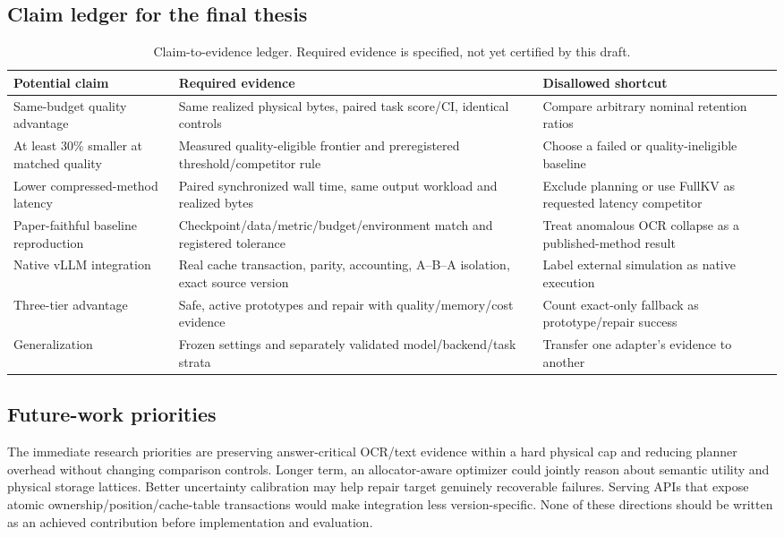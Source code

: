 \subsection{Claim ledger for the final thesis}
\begin{table}[t]
\caption{Claim-to-evidence ledger. Required evidence is specified, not yet
certified by this draft.}
\small\begin{tabularx}{\textwidth}{P{3.5cm}YY}\toprule
Potential claim & Required evidence & Disallowed shortcut\\\midrule
Same-budget quality advantage & Same realized physical bytes, paired task score/CI, identical controls & Compare arbitrary nominal retention ratios\\
At least 30\% smaller at matched quality & Measured quality-eligible frontier and preregistered threshold/competitor rule & Choose a failed or quality-ineligible baseline\\
Lower compressed-method latency & Paired synchronized wall time, same output workload and realized bytes & Exclude planning or use FullKV as requested latency competitor\\
Paper-faithful baseline reproduction & Checkpoint/data/metric/budget/environment match and registered tolerance & Treat anomalous OCR collapse as a published-method result\\
Native vLLM integration & Real cache transaction, parity, accounting, A--B--A isolation, exact source version & Label external simulation as native execution\\
Three-tier advantage & Safe, active prototypes and repair with quality/memory/cost evidence & Count exact-only fallback as prototype/repair success\\
Generalization & Frozen settings and separately validated model/backend/task strata & Transfer one adapter's evidence to another\\
\bottomrule\end{tabularx}
\end{table}

\subsection{Future-work priorities}
The immediate research priorities are preserving answer-critical OCR/text
evidence within a hard physical cap and reducing planner overhead without
changing comparison controls. Longer term, an allocator-aware optimizer could
jointly reason about semantic utility and physical storage lattices. Better
uncertainty calibration may help repair target genuinely recoverable failures.
Serving APIs that expose atomic ownership/position/cache-table transactions
would make integration less version-specific. None of these directions should
be written as an achieved contribution before implementation and evaluation.

